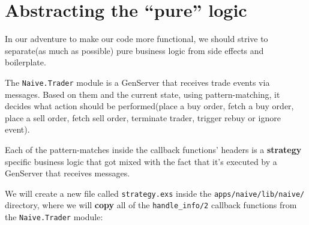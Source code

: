 \documentclass[
  oneside]{book}
\begin{document}
\newpage

\section{Abstracting the ``pure'' logic}\label{abstracting-the-pure-logic}

In our adventure to make our code more functional, we should strive to separate(as much as possible) pure business logic from side effects and boilerplate.

The \texttt{Naive.Trader} module is a GenServer that receives trade events via messages. Based on them and the current state, using pattern-matching, it decides what action should be performed(place a buy order, fetch a buy order, place a sell order, fetch sell order, terminate trader, trigger rebuy or ignore event).

Each of the pattern-matches inside the callback functions' headers is a \textbf{strategy} specific business logic that got mixed with the fact that it's executed by a GenServer that receives messages.

We will create a new file called \texttt{strategy.exs} inside the \texttt{apps/naive/lib/naive/} directory, where we will \textbf{copy} all of the \texttt{handle\_info/2} callback functions from the \texttt{Naive.Trader} module:
\end{document}
